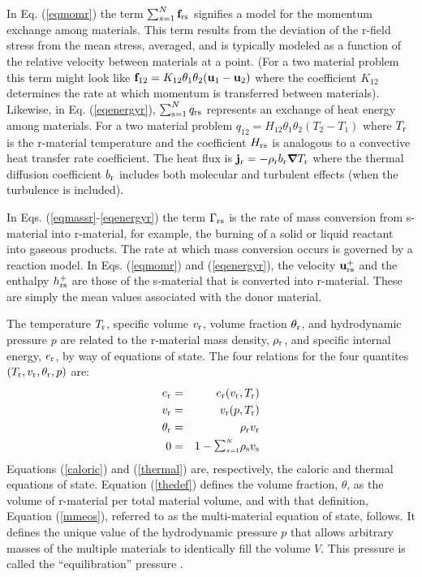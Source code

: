 In Eq. (\ref{eqmomr}) the term $\sum_{s=1}^{N}{\bf f}_{{\rm r}{\rm s}}$ signifies a model for the momentum exchange among materials.  This term results from the deviation of the r-field stress from the mean stress, averaged, and is typically modeled as a function of the relative velocity between materials at a point. (For a two material problem this term might look like ${\bf f}_{12} = K_{12}\theta_1\theta_2({\bf u}_1 - {\bf u}_2)$ where the coefficient $K_{12}$ determines the rate at which momentum is transferred between materials).  Likewise, in Eq. (\ref{eqenergyr}), $\sum_{{\rm s}=1}^{N} q_{{\rm r}{\rm s}}$ represents an exchange of heat energy among materials.  For a two material problem $q_{12} = H_{12}\theta_1\theta_2(T_2 - T_1)$ where $T_{\rm r}$ is the r-material temperature and the coefficient $H_{{\rm r}{\rm s}}$ is analogous to a convective heat transfer rate coefficient.  The heat flux is ${\bf j}_{\rm r} = -\rho_{\rm r} b_{\rm r} \mbox{\boldmath $\nabla \!\!$ \unboldmath} T_{\rm r}$ where the thermal diffusion coefficient $b_{\rm r}$ includes both molecular and turbulent effects (when the turbulence is included).

In Eqs. (\ref{eqmassr}-\ref{eqenergyr}) the term $\Gamma_{{\rm r}{\rm s}}$ is the rate of mass conversion from s-material into r-material, for example, the burning of a solid or liquid reactant into gaseous products.  The rate at which mass conversion occurs is governed by a reaction model.  In Eqs. (\ref{eqmomr}) and (\ref{eqenergyr}), the velocity ${\bf u}_{{\rm r}{\rm s}}^+$ and the enthalpy $h_{{\rm r}{\rm s}}^+$ are those of the s-material that is converted into r-material. These are simply the mean values associated with the donor material.

The temperature $T_{\rm r}$, specific volume $v_{\rm r}$, volume fraction $\theta_{\rm r}$, and hydrodynamic pressure $p$ are related to the r-material mass density, $\rho_{\rm r}$, and specific internal energy, $e_{\rm r}$, by way of equations of state.  The four relations for the four quantites $(T_{\rm r}, v_{\rm r}, \theta_{\rm r}, p)$ are:
%
\begin{eqnarray}
e_\rmr &=& e_\rmr(v_\rmr, T_\rmr) \label{caloric} \\
v_\rmr &=& v_\rmr(p, T_\rmr) \label{thermal} \\
\theta_\rmr &=& \rho_\rmr v_\rmr \label{thedef} \\
0 &=& 1 - \SUM\rho_\rms v_\rms
\label{mmeos}
\end{eqnarray}
%
Equations (\ref{caloric}) and (\ref{thermal}) are, respectively, the caloric and thermal equations of state.  Equation (\ref{thedef}) defines the volume fraction, $\theta$, as the volume of r-material per total material volume, and with that definition, Equation (\ref{mmeos}), referred to as the multi-material equation of state, follows.  It defines the unique value of the hydrodynamic pressure $p$ that allows arbitrary masses of the multiple materials to identically fill the volume $V$.  This pressure is called the ``equilibration'' pressure \cite{kashiwaICE94}.

